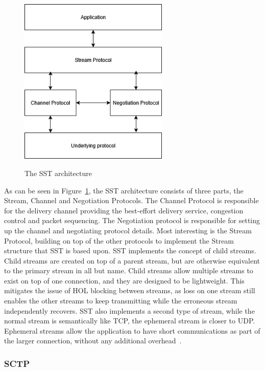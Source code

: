 \documentclass[english, 12pt, a4paper, elec, utf8, a-2b, online]{aaltothesis}
\begin{document}
\begin{figure}[h]
	\centering
	\includegraphics[alt={Diagra of the SST architecture.}, height=8cm]{./images/sst.png}
	\caption{The SST architecture}
	\label{fig:sst_arc}
\end{figure}

As can be seen in Figure~\ref{fig:sst_arc}, the SST architecture consists of three
parts, the Stream, Channel and Negotiation Protocols. The Channel Protocol is responsible
for the delivery channel providing the best-effort delivery service, congestion control
and packet sequencing. The Negotiation protocol is responsible for setting up the channel
and negotiating protocol details. Most interesting is the Stream Protocol, building on
top of the other protocols to implement the Stream structure that SST is based upon.
SST implements the concept of child streams. Child streams are created on top of
a parent stream, but are otherwise equivalent to the primary stream in all but name.
Child streams allow multiple streams to exist on top of one connection, and they
are designed to be lightweight. This mitigates the issue of HOL blocking between streams,
as loss on one stream still enables the other streams to keep transmitting while
the erroneous stream independently recovers. SST also implements a second type of stream,
while the normal stream is semantically like TCP, the ephemeral stream is closer
to UDP. Ephemeral streams allow the application to have short communications as part
of the larger connection, without any additional overhead~\cite{sst}.


\subsubsection{SCTP}
\end{document}
